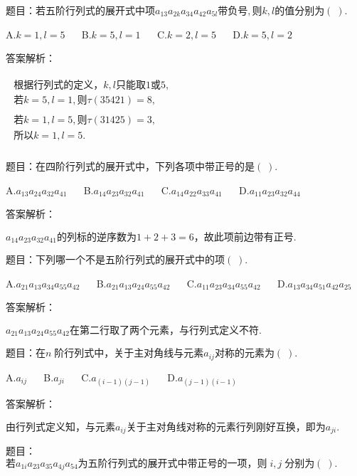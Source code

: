 题目：$\mathrm{若五阶行列式的展开式中项}a_{13}a_{2k}a_{34}a_{42}a_{5l}\mathrm{带负号},\mathrm 则k,l\mathrm{的值分别为}(\;).$

A.$k=1,l=5$ $\quad$ B.$k=5,l=1$ $\quad$ C.$k=2,l=5$ $\quad$ D.$k=5,l=2$

答案解析：

$\begin{array}{l}\begin{array}{l}\mathrm{根据行列式的定义}，k,l\mathrm{只能取}1或5,\\若k=5,l=1,则\tau(35421)=8,\end{array}\\\begin{array}{l}若k=1,l=5,则\tau(31425)=3,\\\mathrm{所以}k=1,l=5.\\\end{array}\end{array}$



题目：$\mathrm{在四阶行列式的展开式中}，\mathrm{下列各项中带正号的是}(\;).$

A.$a_{13}a_{24}a_{32}a_{41}$ $\quad$ B.$a_{14}a_{23}a_{32}a_{41}$ $\quad$ C.$a_{14}a_{22}a_{33}a_{41}$ $\quad$ D.$a_{11}a_{23}a_{32}a_{44}$

答案解析：

$a_{14}a_{23}a_{32}a_{41}\mathrm{的列标的逆序数为}1+2+3=6，\mathrm{故此项前边带有正号}.$



题目：$\mathrm{下列哪一个不是五阶行列式的展开式中的项}(\;).$

A.$a_{21}a_{13}a_{34}a_{55}a_{42}$ $\quad$ B.$a_{21}a_{13}a_{24}a_{55}a_{42}$ $\quad$ C.$a_{11}a_{23}a_{34}a_{55}a_{42}$ $\quad$ D.$a_{13}a_{34}a_{51}a_{42}a_{25}$

答案解析：

$a_{21}a_{13}a_{24}a_{55}a_{42}\mathrm{在第二行取了两个元素}，\mathrm{与行列式定义不符}.$



题目：$在n\;\mathrm{阶行列式中}，\mathrm{关于主对角线与元素}a_{ij}\mathrm{对称的元素为}(\;).$

A.$a_{ij}$ $\quad$ B.$a_{ji}$ $\quad$ C.$a_{(i-1)(j-1)}$ $\quad$ D.$a_{(j-1)(i-1)}$

答案解析：

$\mathrm{由行列式定义知}，\mathrm{与元素}a_{ij}\mathrm{关于主对角线对称的元素行列刚好互换}，\mathrm{即为}a_{ji}.$



题目：$若a_{1i}a_{23}a_{35}a_{4j}a_{54}\mathrm{为五阶行列式的展开式中带正号的一项}，则\;i,j\;\mathrm{分别为}(\;).$


